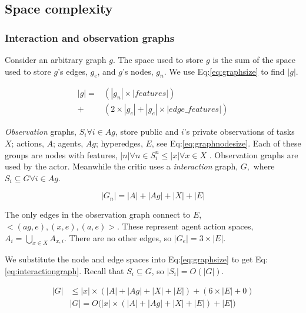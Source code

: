 \documentclass[letterpaper]{article} %
\begin{document}
\subsection{Space complexity}

\subsubsection{Interaction and observation graphs}

Consider an arbitrary graph $g$. The space used to store $g$ is the sum of the space used to store $g$'s edges, $g_e$, and $g$'s nodes, $g_n$. We use Eq:\ref{eq:graphsize} to find $|g|$.

\begin{equation}
    \label{eq:graphsize}
    \begin{split}
    |g| =& (|g_n| \times |features|)\\+& (2 \times|g_e| + |g_e| \times |edge\_features|)
\end{split}
\end{equation}

\textit{Observation} graphs, $S_i\forall i \in Ag$, store public and $i$'s private observations of tasks $X$; actions, $A$; agents, $Ag$; hyperedges, $E$, see Eq:\ref{eq:graphnodesize}. Each of these groups are nodes with features,  $|n|\forall n \in S^n_i \leq |x| \forall x \in X$ . Observation graphs are used by the actor. Meanwhile the critic uses a \textit{interaction} graph, $G,$ where $ S_i\subseteq G \forall i \in Ag$. 

\begin{equation}
\label{eq:graphnodesize}
    |G_n| = |A| + |Ag| + |X| + |E|
\end{equation}



 The only edges in the observation graph connect to $E$, $<(ag,e), (x,e), (a,e)>$. These represent agent action spaces, $A_i=\bigcup_{x\in X}A_{x,i}$. There are no other edges, so $|G_e|=3\times |E|$.

 We substitute the node and edge spaces into Eq:\ref{eq:graphsize} to get Eq:\ref{eq:interactiongraph}. Recall that $S_i \subseteq G$, so $|S_i|=O(|G|)$. 

 \begin{equation}
 \label{eq:interactiongraph}
 \begin{split}
      |G|& \leq |x| \times (|A| + |Ag| + |X| + |E|) + (6\times |E| + 0)\\
     &|G| = O\big(|x| \times(|A| + |Ag| + |X| + |E|) + |E|\big)
 \end{split}
 \end{equation}
\end{document}
